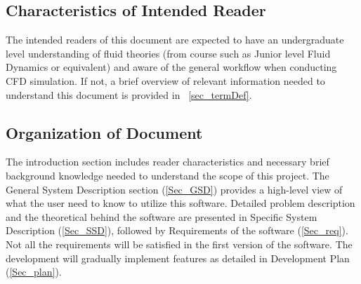 \documentclass[12pt]{article}
\begin{document}


\subsection{Characteristics of Intended Reader} \label{sec_IntendedReader}

The intended readers of this document are expected to have an undergraduate level understanding of fluid theories (from course such as Junior level Fluid Dynamics or equivalent) and aware of the general workflow when conducting CFD simulation. If not, a brief overview of relevant information needed to understand this document is provided in ~\ref{sec_termDef}.



\subsection{Organization of Document}
The introduction section includes reader characteristics and necessary brief background knowledge needed to understand the scope of this project. The General System Description section (\ref{Sec_GSD}) provides a high-level view of what the user need to know to utilize this software. Detailed problem description and the theoretical behind the software are presented in Specific System Description (\ref{Sec_SSD}), followed by Requirements of the software (\ref{Sec_req}). Not all the requirements will be satisfied in the first version of the software. The development will gradually implement features as detailed in Development Plan (\ref{Sec_plan}).
\end{document}
